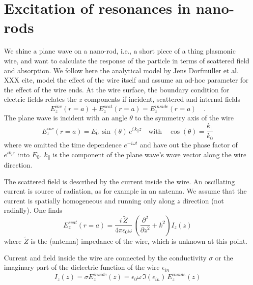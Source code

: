 \section{Excitation of resonances in nano-rods}

We shine a plane wave on a nano-rod, i.e., a short piece of a thing plasmonic wire, and want to calculate the response of the particle in terms of scattered field and absorption. We follow here the analytical model by Jens Dorfmüller et al. XXX cite,  model the effect of the wire itself and assume an ad-hoc parameter for the effect of the wire ends. At the wire surface, the boundary condition for electric fields relates the $z$ components if incident, scattered and internal fields
\begin{equation}
  E_{z}^{inc}(r = a) +  E_{z}^{scat}(r = a) =  E_{z}^{inside}(r = a) \quad .
\end{equation}
The  plane wave is incident with an angle $\theta$ to the symmetry axis of the wire
\begin{equation}
  E_{z}^{inc}(r = a) = E_0 \, \sin ( \theta) \, e^{i \, k_\parallel z} \quad \text{with} \quad \cos ( \theta) = \frac{k_\parallel}{k_0}
\end{equation}
where we omitted the time dependence $e^{-i \omega t}$ and have out the phase factor of $e^{i k_r r}$ into $E_0$. $k_\parallel$ is the component of the plane wave's wave vector along the wire direction.


The scattered field is described by the current inside the wire. An oscillating current is source of radiation, as for example in an antenna. We assume that the current is spatially homogeneous and running only along $z$ direction (not radially). One finds
\begin{equation}
  E_{z}^{scat}(r = a) =  \frac{i \, \tilde{Z}}{4 \pi  \epsilon_0 \omega} \,   
  \left( \frac{\partial^2}{\partial z^2} + k^2 \right)  I_z(z)
\end{equation}
where $\tilde{Z}$ is the (antenna) impedance of the wire, which is unknown at this point.

Current and field inside the wire are connected by the conductivity $\sigma$ or the imaginary part of the dielectric function of the wire $\epsilon_{in}$
\begin{equation}
  I_z(z) = \sigma E_{z}^{inside}(z) = 
  \epsilon_0 \omega  \, \Im(\epsilon_{in}) \,  E_{z}^{inside}(z)
\end{equation}

